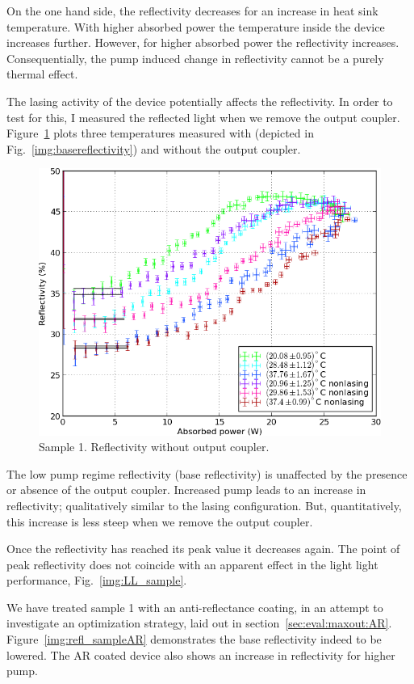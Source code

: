 On the one hand side,
the reflectivity decreases
for an increase
in heat sink temperature.
With higher absorbed power
the temperature
inside the device
increases further.
However,
for higher absorbed power
the reflectivity increases.
Consequentially,
the pump induced change in reflectivity
cannot be a purely thermal effect.

The lasing activity
of the device
potentially affects the reflectivity.
In order to test for this,
I measured
the reflected light
when we remove the output coupler.
Figure~\ref{img:basereflectivity_nooc}
plots three temperatures
measured with
(depicted in Fig.~\ref{img:basereflectivity})
and without the output coupler.

\begin{figure}
\centering
\includegraphics[width=14.5cm]{img/basereflectivity_noOC.png}
\caption{Sample 1.
Reflectivity without output coupler.}
\label{img:basereflectivity_nooc}
\end{figure}

The low pump regime reflectivity
(base reflectivity)
is unaffected
by the presence or absence
of the output coupler.
Increased pump
leads to an increase
in reflectivity;
qualitatively similar
to the lasing configuration.
But,
quantitatively,
this increase is less steep
when we remove the output coupler.

Once the reflectivity has reached
its peak value
it decreases again.
The point of peak reflectivity
does not coincide
with an apparent effect
in the light light performance,
Fig.~\ref{img:LL_sample}.

We have treated sample 1
with an anti-reflectance coating,
in an attempt to investigate
an optimization strategy,
laid out in section~\ref{sec:eval:maxout:AR}.
Figure~\ref{img:refl_sampleAR}
demonstrates the base reflectivity
indeed to be lowered.
The AR coated device
also shows an increase
in reflectivity
for higher pump.


